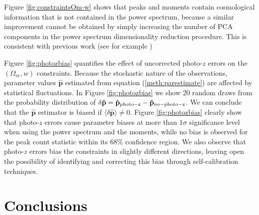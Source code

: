 \documentclass[reprint,aps,prd,superscriptaddress,showkeys,showpacs]{revtex4-1}
\newcommand{\bbh}[1]{\mathbf{\hat{#1}}}
\begin{document}
Figure \ref{fig:constraintsOm-w} shows that peaks and moments contain cosmological information that is not contained in the power spectrum, because a similar improvement cannot be obtained by simply increasing the number of PCA components in the power spectrum dimensionality reduction procedure. This is consistent with previous work (see for example \citep{CFHTMink})

Figure \ref{fig:photozbias} quantifies the effect of uncorrected photo-$z$ errors on the $(\Omega_m,w)$ constraints. Because the stochastic nature of the observations, parameter values $\bbh{p}$ estimated from equation (\ref{meth:parestimate}) are affected by statistical fluctuations. In Figure \ref{fig:photozbias} we show 20 random draws from the probability distribution of $\delta \bbh{p}=\bbh{p}_{\rm photo-z}-\bbh{p}_{\rm no-photo-z}$. We can conclude that the $\bbh{p}$ estimator is biased if $\langle\delta\bbh{p}\rangle\neq 0$. Figure \ref{fig:photozbias} clearly show that photo-$z$ errors cause parameter biases at more than $1\sigma$ significance level when using the power spectrum and the moments, while no bias is observed for the peak count statistic within its 68\% confidence region. We also observe that photo-$z$ errors bias the constraints in slightly different directions, leaving open the possibility of identifying and correcting this bias through self-calibration techniques.         


\section{Conclusions}
\label{sec:conclusions}
\end{document}
